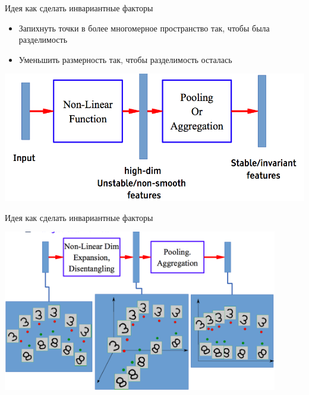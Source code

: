 \documentclass[14pt, fleqn, xcolor={dvipsnames, table}]{beamer}
\begin{document}
\begin{frame}{Идея как сделать инвариантные факторы}
\small
\begin{itemize}
  \item Запихнуть точки в более многомерное пространство так, чтобы была разделимость
  \item Уменьшить размерность так, чтобы разделимость осталась
\end{itemize}
\begin{center}
\includegraphics[height=0.4\textheight]{invariantfeaturelearning.png}
\end{center}
\end{frame}

\begin{frame}{Идея как сделать инвариантные факторы}
\begin{center}
\includegraphics[width=0.9\textwidth]{fullconvcycle.png}
\end{center}
\end{frame}
\end{document}
